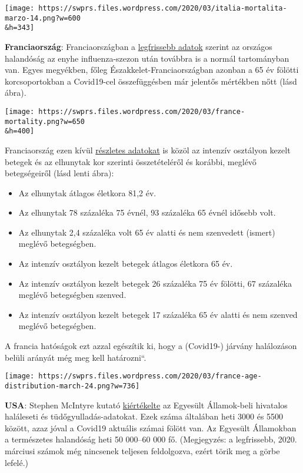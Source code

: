 \texttt{[image: https://swprs.files.wordpress.com/2020/03/italia-mortalita-marzo-14.png?w=600\\\&h=343]}

\textbf{Franciaország}: Franciaországban a
\href{https://www.santepubliquefrance.fr/maladies-et-traumatismes/maladies-et-infections-respiratoires/infection-a-coronavirus/documents/bulletin-national/covid-19-point-epidemiologique-du-24-mars-2020}{legfrissebb
adatok} szerint az országos halandóság az enyhe influenza-szezon után
továbbra is a normál tartományban van. Egyes megyékben, főleg
Északkelet-Franciaországban azonban a 65 év fölötti korcsoportokban a
Covid19-cel összefüggésben már jelentős mértékben nőtt (lásd ábra).

\texttt{[image: https://swprs.files.wordpress.com/2020/03/france-mortality.png?w=650\\\&h=400]}

Franciaország ezen kívül
\href{https://www.santepubliquefrance.fr/maladies-et-traumatismes/maladies-et-infections-respiratoires/infection-a-coronavirus/documents/bulletin-national/covid-19-point-epidemiologique-du-24-mars-2020}{részletes
adatokat} is közöl az intenzív osztályon kezelt betegek és az elhunytak
kor szerinti összetételéről és korábbi, meglévő betegségeiről (lásd
lenti ábra):

\begin{itemize}
\tightlist
\item
  Az elhunytak átlagos életkora 81,2 év.
\item
  Az elhunytak 78 százaléka 75 évnél, 93 százaléka 65 évnél idősebb
  volt.
\item
  Az elhunytak 2,4 százaléka volt 65 év alatti és nem szenvedett
  (ismert) meglévő betegségben.
\item
  Az intenzív osztályon kezelt betegek átlagos életkora 65 év.
\item
  Az intenzív osztályon kezelt betegek 26 százaléka 75 év fölötti, 67
  százaléka meglévő betegségben szenved.
\item
  Az intenzív osztályon kezelt betegek 17 százaléka 65 év alatti és nem
  szenved meglévő betegségben.
\end{itemize}

A francia hatóságok ezt azzal egészítik ki, hogy a (Covid19-) járvány
halálozáson belüli arányát még meg kell határozni``.

\texttt{[image: https://swprs.files.wordpress.com/2020/03/france-age-distribution-march-24.png?w=736]}

\textbf{USA}: Stephen McIntyre kutató
\href{https://twitter.com/ClimateAudit/status/1243019315462516736}{kiértékelte}
az Egyesült Államok-beli hivatalos haláleseti és tüdőgyulladás-adatokat.
Ezek száma általában heti 3000 és 5500 között, azaz jóval a Covid19
aktuális számai fölött van. Az Egyesült Államokban a természetes
halandóság heti 50 000--60 000 fő. (Megjegyzés: a legfrissebb, 2020.
márciusi számok még nincsenek teljesen feldolgozva, ezért törik meg a
görbe lefelé.)

